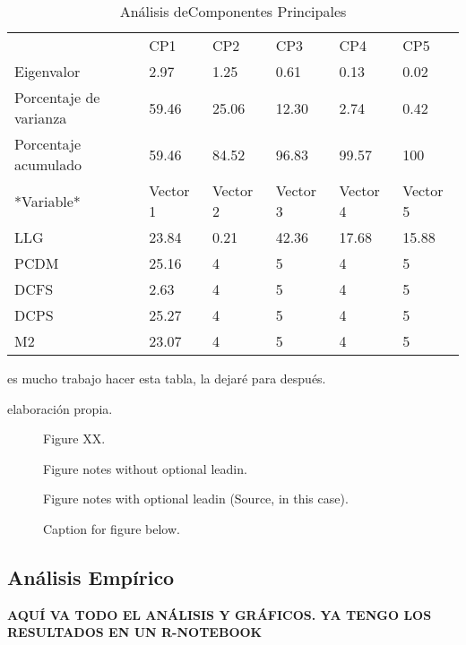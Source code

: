 \documentclass[]{AEA}
\begin{document}
\begin{table}

\caption{Análisis deComponentes Principales}

\begin{tabular}{llllll}
& CP1 & CP2 & CP3 & CP4 & CP5 \\
Eigenvalor & 2.97 & 1.25 & 0.61 & 0.13 & 0.02 \\
Porcentaje de varianza & 59.46 & 25.06 & 12.30 & 2.74 & 0.42 \\
Porcentaje acumulado & 59.46 & 84.52 & 96.83 & 99.57 & 100 \\
*Variable* & Vector 1 & Vector 2 & Vector 3 & Vector 4 & Vector 5 \\
LLG & 23.84 & 0.21 & 42.36 & 17.68 & 15.88 \\
PCDM & 25.16 & 4 & 5 & 4 & 5 \\
DCFS & 2.63 & 4 & 5 & 4 & 5 \\
DCPS & 25.27 & 4 & 5 & 4 & 5 \\
M2 & 23.07 & 4 & 5 & 4 & 5
\end{tabular}

\begin{tablenotes} [Nota]
es mucho trabajo hacer esta tabla, la dejaré para después.
\end{tablenotes}

\begin{tablenotes}[Fuente]
elaboración propia.
\end{tablenotes}

\end{table}

\begin{figure}
Figure XX.
\caption{Caption for figure below.}
\begin{figurenotes}
Figure notes without optional leadin.
\end{figurenotes}
\begin{figurenotes}[Source]
Figure notes with optional leadin (Source, in this case).
\end{figurenotes}
\end{figure}

\hypertarget{analisis-empirico}{%
\subsection{Análisis Empírico}\label{analisis-empirico}}

\textbf{AQUÍ VA TODO EL ANÁLISIS Y GRÁFICOS. YA TENGO LOS RESULTADOS EN
UN R-NOTEBOOK}
\end{document}

